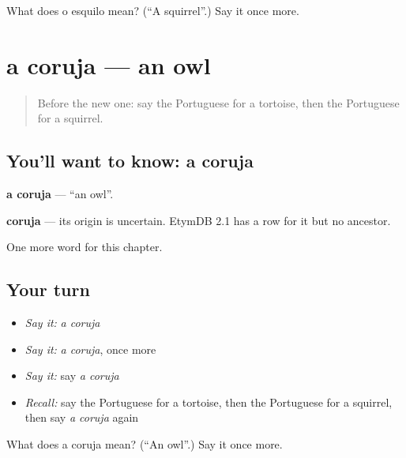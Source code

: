 \begin{tcolorbox}[breakable,colback=teal!4,colframe=teal!35!black,title={Before you move on}]
What does o esquilo mean? (\textquotedblleft{}A squirrel\textquotedblright{}.) Say it once more.
\end{tcolorbox}
\section[a coruja]{a coruja — an owl}

\label{lesson:PT-C119-coruja}



\begin{quote}
Before the new one: say the Portuguese for a tortoise, then the Portuguese for a squirrel.
\end{quote}

\subsection*{You'll want to know: a coruja}
\textbf{a coruja} — \textquotedblleft{}an owl\textquotedblright{}.

\begin{cousinweb}
\textbf{coruja} — its origin is uncertain. EtymDB 2.1 has a row for it but no ancestor.
\end{cousinweb}

\begin{grammarlens}[title={What you've built}]
One more word for this chapter.
\end{grammarlens}

\subsection*{Your turn}
\begin{itemize}
\raggedright
  \item \emph{Say it:} \emph{a coruja}
  \item \emph{Say it:} \emph{a coruja}, once more
  \item \emph{Say it:} say \emph{a coruja}
  \item \emph{Recall:} say the Portuguese for a tortoise, then the Portuguese for a squirrel, then say \emph{a coruja} again
\end{itemize}

\begin{tcolorbox}[breakable,colback=teal!4,colframe=teal!35!black,title={Before you move on}]
What does a coruja mean? (\textquotedblleft{}An owl\textquotedblright{}.) Say it once more.
\end{tcolorbox}
